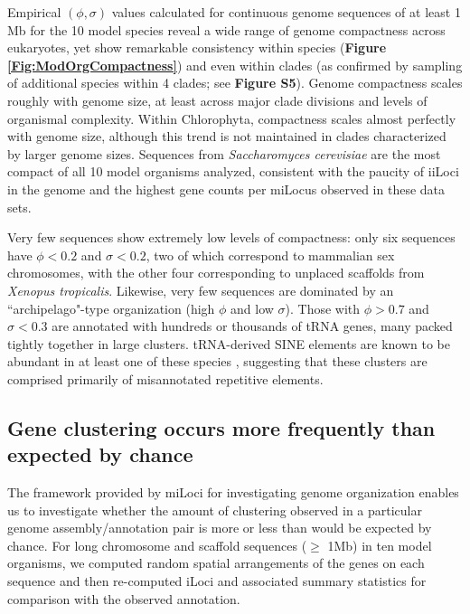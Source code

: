 Empirical $(\phi,\sigma)$ values calculated for continuous genome sequences of at least 1 Mb for the 10 model species reveal a wide range of genome compactness across eukaryotes, yet show remarkable consistency within species (\textbf{Figure \ref{Fig:ModOrgCompactness}}) and even within clades (as confirmed by sampling of additional species within 4 clades; see \textbf{Figure S5}).
Genome compactness scales roughly with genome size, at least across major clade divisions and levels of organismal complexity.
Within Chlorophyta, compactness scales almost perfectly with genome size, although this trend is not maintained in clades characterized by larger genome sizes.
Sequences from \textit{Saccharomyces cerevisiae} are the most compact of all 10 model organisms analyzed, consistent with the paucity of iiLoci in the genome and the highest gene counts per miLocus observed in these data sets.

Very few sequences show extremely low levels of compactness: only six sequences have $\phi < 0.2$ and $\sigma < 0.2$, two of which correspond to mammalian sex chromosomes, with the other four corresponding to unplaced scaffolds from \textit{Xenopus tropicalis}.
Likewise, very few sequences are dominated by an ``archipelago"-type organization (high $\phi$ and low $\sigma$).
Those with $\phi > 0.7$ and $\sigma < 0.3$ are annotated with hundreds or thousands of tRNA genes, many packed tightly together in large clusters.
tRNA-derived SINE elements are known to be abundant in at least one of these species \cite{DrerGenome}, suggesting that these clusters are comprised primarily of misannotated repetitive elements.

\subsection{Gene clustering occurs more frequently than expected by chance}

The framework provided by miLoci for investigating genome organization enables us to investigate whether the amount of clustering observed in a particular genome assembly/annotation pair is more or less than would be expected by chance.
For long chromosome and scaffold sequences ($\geq$ 1Mb) in ten model organisms, we computed random spatial arrangements of the genes on each sequence and then re-computed iLoci and associated summary statistics for comparison with the observed annotation.

